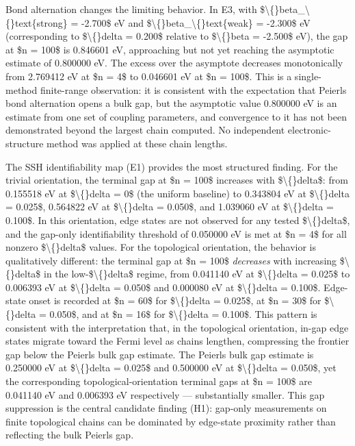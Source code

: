 \documentclass[11pt,a4paper]{article}
\begin{document}
Bond alternation changes the limiting behavior. In E3, with \$\textbackslash\{\}beta\_\textbackslash\{\}text\{strong\} = -2.700\$ eV and \$\textbackslash\{\}beta\_\textbackslash\{\}text\{weak\} = -2.300\$ eV (corresponding to \$\textbackslash\{\}delta = 0.200\$ relative to \$\textbackslash\{\}beta = -2.500\$ eV), the gap at \$n = 100\$ is 0.846601 eV, approaching but not yet reaching the asymptotic estimate of 0.800000 eV. The excess over the asymptote decreases monotonically from 2.769412 eV at \$n = 4\$ to 0.046601 eV at \$n = 100\$. This is a single-method finite-range observation: it is consistent with the expectation that Peierls bond alternation opens a bulk gap, but the asymptotic value 0.800000 eV is an estimate from one set of coupling parameters, and convergence to it has not been demonstrated beyond the largest chain computed. No independent electronic-structure method was applied at these chain lengths.

The SSH identifiability map (E1) provides the most structured finding. For the trivial orientation, the terminal gap at \$n = 100\$ increases with \$\textbackslash\{\}delta\$: from 0.155518 eV at \$\textbackslash\{\}delta = 0\$ (the uniform baseline) to 0.343804 eV at \$\textbackslash\{\}delta = 0.025\$, 0.564822 eV at \$\textbackslash\{\}delta = 0.050\$, and 1.039060 eV at \$\textbackslash\{\}delta = 0.100\$. In this orientation, edge states are not observed for any tested \$\textbackslash\{\}delta\$, and the gap-only identifiability threshold of 0.050000 eV is met at \$n = 4\$ for all nonzero \$\textbackslash\{\}delta\$ values. For the topological orientation, the behavior is qualitatively different: the terminal gap at \$n = 100\$ \textit{decreases} with increasing \$\textbackslash\{\}delta\$ in the low-\$\textbackslash\{\}delta\$ regime, from 0.041140 eV at \$\textbackslash\{\}delta = 0.025\$ to 0.006393 eV at \$\textbackslash\{\}delta = 0.050\$ and 0.000080 eV at \$\textbackslash\{\}delta = 0.100\$. Edge-state onset is recorded at \$n = 60\$ for \$\textbackslash\{\}delta = 0.025\$, at \$n = 30\$ for \$\textbackslash\{\}delta = 0.050\$, and at \$n = 16\$ for \$\textbackslash\{\}delta = 0.100\$. This pattern is consistent with the interpretation that, in the topological orientation, in-gap edge states migrate toward the Fermi level as chains lengthen, compressing the frontier gap below the Peierls bulk gap estimate. The Peierls bulk gap estimate is 0.250000 eV at \$\textbackslash\{\}delta = 0.025\$ and 0.500000 eV at \$\textbackslash\{\}delta = 0.050\$, yet the corresponding topological-orientation terminal gaps at \$n = 100\$ are 0.041140 eV and 0.006393 eV respectively — substantially smaller. This gap suppression is the central candidate finding (H1): gap-only measurements on finite topological chains can be dominated by edge-state proximity rather than reflecting the bulk Peierls gap.
\end{document}
